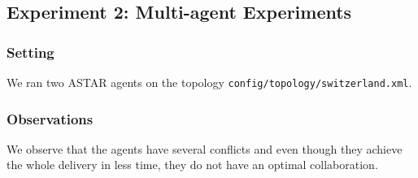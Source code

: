 \documentclass[11pt]{article}
\begin{document}
\subsection{Experiment 2: Multi-agent Experiments}

\subsubsection{Setting}
We ran two ASTAR agents on the topology \verb|config/topology/switzerland.xml|.

\subsubsection{Observations}
We observe that the agents have several conflicts and even though they achieve the whole delivery in less time, they do not have an optimal collaboration.
\end{document}
